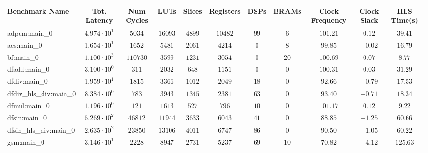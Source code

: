 \begin{tabular}{|l|c|c|c|c|c|c|c|c|c|c|}
\hline
Benchmark Name          & Tot. Latency           & Num Cycles & LUTs      & Slices    & Registers & DSPs    & BRAMs   & Clock Frequency & Clock Slack & HLS Time(s) \\
\hline
adpcm:main\_0           & $ 4.974 \cdot 10^{1} $ & $ 5034   $ & $ 16093 $ & $ 4899  $ & $ 10482 $ & $ 99  $ & $ 6   $ & $ 101.21      $ & $ 0.12    $ & $ 39.41   $ \\
aes:main\_0             & $ 1.654 \cdot 10^{1} $ & $ 1652   $ & $ 5481  $ & $ 2061  $ & $ 4214  $ & $ 0   $ & $ 8   $ & $ 99.85       $ & $ -0.02   $ & $ 16.79   $ \\
bf:main\_0              & $ 1.100 \cdot 10^{3} $ & $ 110730 $ & $ 3599  $ & $ 1231  $ & $ 3054  $ & $ 0   $ & $ 20  $ & $ 100.69      $ & $ 0.07    $ & $ 8.77    $ \\
dfadd:main\_0           & $ 3.100 \cdot 10^{0} $ & $ 311    $ & $ 2032  $ & $ 648   $ & $ 1151  $ & $ 0   $ & $ 0   $ & $ 100.31      $ & $ 0.03    $ & $ 31.29   $ \\
dfdiv:main\_0           & $ 1.959 \cdot 10^{1} $ & $ 1815   $ & $ 3366  $ & $ 1012  $ & $ 2049  $ & $ 18  $ & $ 0   $ & $ 92.66       $ & $ -0.79   $ & $ 17.53   $ \\
dfdiv\_hls\_div:main\_0 & $ 8.384 \cdot 10^{0} $ & $ 783    $ & $ 3943  $ & $ 1345  $ & $ 2381  $ & $ 63  $ & $ 0   $ & $ 93.40       $ & $ -0.71   $ & $ 18.34   $ \\
dfmul:main\_0           & $ 1.196 \cdot 10^{0} $ & $ 121    $ & $ 1613  $ & $ 527   $ & $ 796   $ & $ 10  $ & $ 0   $ & $ 101.17      $ & $ 0.12    $ & $ 9.22    $ \\
dfsin:main\_0           & $ 5.269 \cdot 10^{2} $ & $ 46812  $ & $ 11944 $ & $ 3633  $ & $ 6043  $ & $ 41  $ & $ 0   $ & $ 88.85       $ & $ -1.25   $ & $ 60.66   $ \\
dfsin\_hls\_div:main\_0 & $ 2.635 \cdot 10^{2} $ & $ 23850  $ & $ 13106 $ & $ 4011  $ & $ 6747  $ & $ 86  $ & $ 0   $ & $ 90.50       $ & $ -1.05   $ & $ 60.22   $ \\
gsm:main\_0             & $ 3.146 \cdot 10^{1} $ & $ 2228   $ & $ 8947  $ & $ 2731  $ & $ 5237  $ & $ 69  $ & $ 10  $ & $ 70.82       $ & $ -4.12   $ & $ 125.63  $ \\

\end{tabular}
